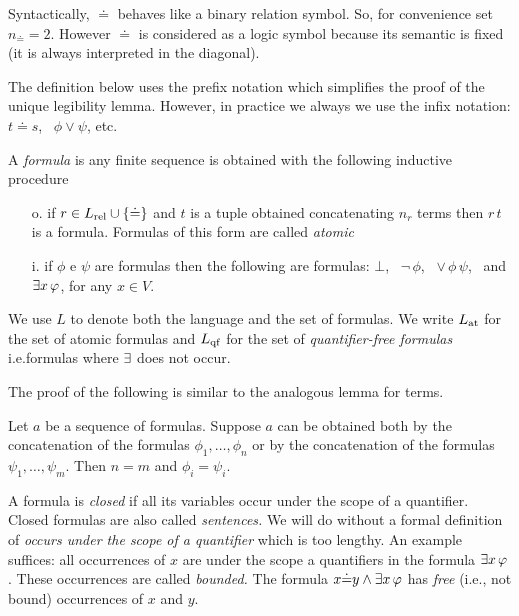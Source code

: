 %
%

%


Syntactically, $\doteq$ behaves like a binary relation symbol. So, for convenience set $n_{\scriptscriptstyle\doteq}=2$.
However $\doteq$ is considered as a logic symbol because its semantic is fixed (it is always interpreted in the diagonal).

The definition below uses the prefix notation which simplifies the proof of the unique legibility lemma.
However, in practice we always we use the infix notation: $t\doteq s$, \ $\phi\vee\psi$, etc.


\begin{definition}\label{defformule} 
A \emph{formula\/} is any finite sequence is obtained with the following inductive procedure

\begin{itemize}
\item[o.] if $r\in L_{\rm rel}\cup \{\doteq\}$ and $t$ is a tuple obtained concatenating $n_r$ terms then $r\,t$ is a formula. Formulas of this form are called \emph{atomic}

\item[i.] if $\phi$ e $\psi$ are formulas then the following are formulas: $\bot$, \ ${\neg}\,\phi$, \ ${\vee}\,\phi\,\psi$, \ and $\exists x\,\varphi$, for any $x\in V$.
\end{itemize}
\end{definition}

We use \emph{$L$\/} to denote both the language and the set of formulas.
We write \emph{$L_{\rm at}$\/} for the set of atomic formulas and \emph{$L_{\rm qf}$\/} for the set of \emph{quantifier-free formulas\/} i.e.\@ formulas where $\exists$ does not occur.

The proof of the following is similar to the analogous lemma for terms.

\begin{lemma}
\label{lemmaformuleleggibilita}
Let $a$ be a sequence of formulas.
Suppose $a$ can be obtained both by the concatenation of the formulas $\phi_1,\dots,\phi_n$ or by the concatenation of the formulas $\psi_1,\dots,\psi_m$.
Then $n=m$ and $\phi_i=\psi_i$.
\end{lemma}

A formula is \emph{closed\/} if all its variables occur under the scope of a quantifier.
Closed formulas are also called \emph{sentences.}
We will do without a formal definition of \textit{occurs under the scope of a quantifier\/} which is too lengthy. An example suffices: all occurrences of $x$ are under the scope a quantifiers in the formula $\exists x\,\varphi$.
These occurrences are called \emph{bounded.}
The formula $x{\doteq}y\wedge\exists x\,\varphi$ has \emph{free\/} (i.e., not bound) occurrences of $x$ and $y$.

